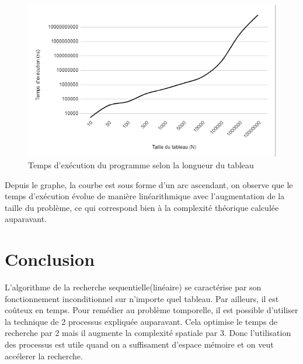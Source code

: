\begin{figure}[H]
    \centering
        \includegraphics[scale=0.5]{./ressources/tempsexecutiondico.png}
        \caption{Temps d'exécution du programme selon la longueur du tableau}
    \label{fig:temps_exec_seq}
\end{figure}
\par
Depuis le graphe, la courbe est sous forme d'un arc ascendant, on observe que le temps d'exécution évolue de manière linéarithmique avec l'augmentation de la taille du problème, ce qui correspond bien à la complexité théorique calculée auparavant. 

\section{Conclusion}
L'algorithme de la recherche sequentielle(linéaire) se caractérise par son fonctionnement inconditionnel sur n'importe quel tableau. Par ailleurs, il est coûteux en temps. Pour remédier au problème tomporelle, il est possible d'utiliser  la technique de 2 processus expliquée auparavant. Cela optimise le temps de recherche par 2 mais il augmente la complexité spatiale par 3. Donc l'utilisation des processus est utile quand on a suffisament d'espace mémoire et on veut accélerer la recherche.